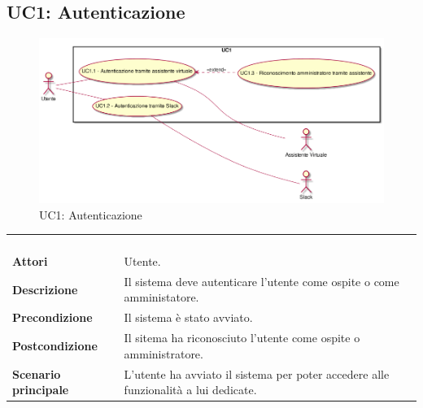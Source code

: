\newpage\subsection{UC1: Autenticazione}
\label{UC1}
\begin{figure}[h]
\centering
\includegraphics[width=\textwidth,height=\textheight,keepaspectratio]{images/UseCaseUC1.png}
\caption{UC1: Autenticazione}
\end{figure}
\begin{longtable}{l|p{10cm}}
\rowcolor[gray]{0.8} \multicolumn{2}{c}{} \\
\rowcolor[gray]{0.8} \multicolumn{2}{c}{\textbf{UC1 - Autenticazione}} \\
\rowcolor[gray]{0.8} \multicolumn{2}{c}{} \\
\hline
&\\
\textbf{Attori} & Utente.\\[7pt]
\textbf{Descrizione} & Il sistema deve autenticare l'utente come ospite o come amministatore.\\[7pt]
\textbf{Precondizione} & Il sistema è stato avviato.\\[7pt]
\textbf{Postcondizione} & Il sitema ha riconosciuto l'utente come ospite o amministratore.\\[7pt]
\textbf{Scenario principale} &L'utente ha avviato il sistema per poter accedere alle funzionalità a lui dedicate.\\[7pt]\hline
\end{longtable}

